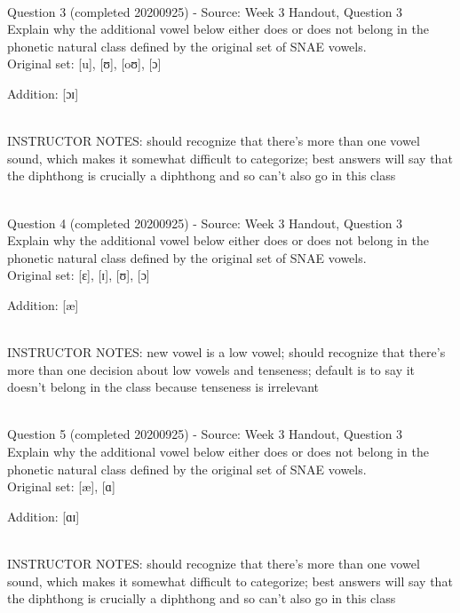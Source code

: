 \documentclass[12pt]{article}
\begin{document}
~\\

{\large Question 3} (completed 20200925) - Source: Week 3 Handout, Question 3\\

Explain why the additional vowel below either does or does not belong in the phonetic natural class defined by the original set of SNAE vowels.\\

Original set: {[u]}, {[ʊ]}, {[oʊ]}, {[ɔ]}

Addition: {[ɔɪ]}


~\\
INSTRUCTOR NOTES: should recognize that there's more than one vowel sound, which makes it somewhat difficult to categorize; best answers will say that the diphthong is crucially a diphthong and so can't also go in this class


~\\

{\large Question 4} (completed 20200925) - Source: Week 3 Handout, Question 3\\

Explain why the additional vowel below either does or does not belong in the phonetic natural class defined by the original set of SNAE vowels.\\

Original set: {[ɛ]}, {[ɪ]}, {[ʊ]}, {[ɔ]}

Addition: {[æ]}


~\\
INSTRUCTOR NOTES: new vowel is a low vowel; should recognize that there's more than one decision about low vowels and tenseness; default is to say it doesn't belong in the class because tenseness is irrelevant


~\\

{\large Question 5} (completed 20200925) - Source: Week 3 Handout, Question 3\\

Explain why the additional vowel below either does or does not belong in the phonetic natural class defined by the original set of SNAE vowels.\\

Original set: {[æ]}, {[ɑ]}

Addition: {[ɑɪ]}


~\\
INSTRUCTOR NOTES: should recognize that there's more than one vowel sound, which makes it somewhat difficult to categorize; best answers will say that the diphthong is crucially a diphthong and so can't also go in this class
\end{document}
